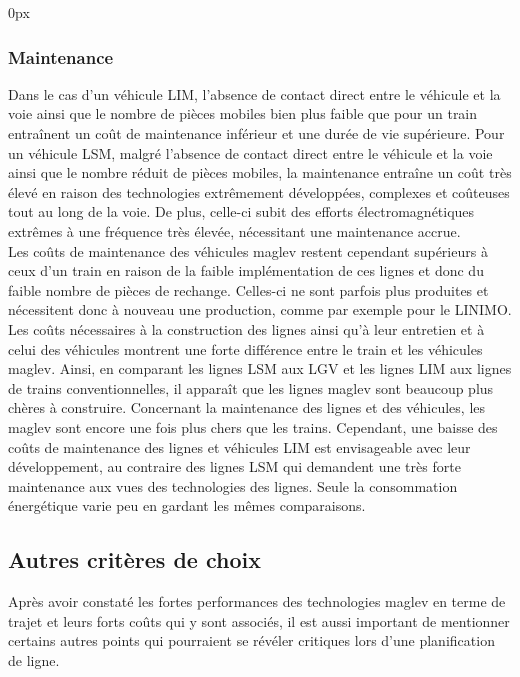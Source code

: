 \documentclass[12pt, a4paper, onecolumn]{article}
\renewcommand{\tab}{\tabto{15px}}
\begin{document}
\pagebreak %
\begin{addmargin}[30px]{0px} \subsubsection*{Maintenance}\end{addmargin}

\tab Dans le cas d'un véhicule LIM, l'absence de contact direct entre le véhicule et la voie ainsi que le nombre de pièces mobiles bien plus faible que pour un train entraînent un coût de maintenance inférieur et une durée de vie supérieure.
Pour un véhicule LSM, malgré l'absence de contact direct entre le véhicule et la voie ainsi que le nombre réduit de pièces mobiles, la maintenance entraîne un coût très élevé en raison des technologies extrêmement développées, complexes et coûteuses tout au long de la voie.
De plus, celle-ci subit des efforts électromagnétiques extrêmes à une fréquence très élevée, nécessitant une maintenance accrue. \\
\linebreak
\tab Les coûts de maintenance des véhicules maglev restent cependant supérieurs à ceux d'un train en raison de la faible implémentation de ces lignes et donc du faible nombre de pièces de rechange.
Celles-ci ne sont parfois plus produites et nécessitent donc à nouveau une production, comme par exemple pour le LINIMO. \\
\linebreak
\linebreak
\tab Les coûts nécessaires à la construction des lignes ainsi qu'à leur entretien et à celui des véhicules montrent une forte différence entre le train et les véhicules maglev.
Ainsi, en comparant les lignes LSM aux LGV et les lignes LIM aux lignes de trains conventionnelles, il apparaît que les lignes maglev sont beaucoup plus chères à construire.
Concernant la maintenance des lignes et des véhicules, les maglev sont encore une fois plus chers que les trains.
Cependant, une baisse des coûts de maintenance des lignes et véhicules LIM est envisageable avec leur développement, au contraire des lignes LSM qui demandent une très forte maintenance aux vues des technologies des lignes.
Seule la consommation énergétique varie peu en gardant les mêmes comparaisons.



\pagebreak %
\subsection{Autres critères de choix}
\tab Après avoir constaté les fortes performances des technologies maglev en terme de trajet et leurs forts coûts qui y sont associés, il est aussi important de mentionner certains autres points qui pourraient se révéler critiques lors d'une planification de ligne.
\end{document}
